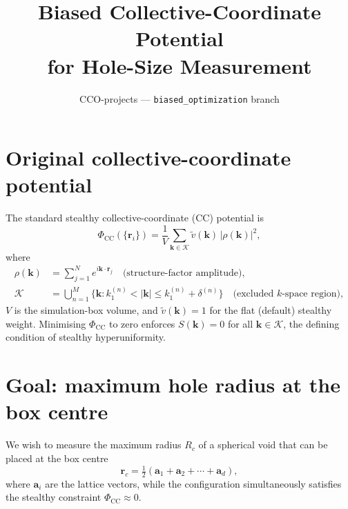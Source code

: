 \documentclass[11pt]{article}
\title{Biased Collective-Coordinate Potential\\for Hole-Size Measurement}
\author{CCO-projects --- \texttt{biased\_optimization} branch}
\date{}
\begin{document}
\maketitle
\tableofcontents
\bigskip

\section{Original collective-coordinate potential}

The standard stealthy collective-coordinate (CC) potential is
\begin{equation}
    \Phi_{\mathrm{CC}}(\{\mathbf{r}_i\})
    = \frac{1}{V}
      \sum_{\mathbf{k}\in\mathcal{K}}
      \tilde{v}(\mathbf{k})\,|\rho(\mathbf{k})|^{2},
    \label{eq:cc}
\end{equation}
where
\begin{align}
    \rho(\mathbf{k}) &= \sum_{j=1}^{N} e^{i\mathbf{k}\cdot\mathbf{r}_j}
    \quad\text{(structure-factor amplitude)},\\[4pt]
    \mathcal{K} &= \bigcup_{n=1}^{M}
        \bigl\{\mathbf{k} : k_1^{(n)} < |\mathbf{k}| \le k_1^{(n)}+\delta^{(n)}\bigr\}
    \quad\text{(excluded $k$-space region)},
\end{align}
$V$ is the simulation-box volume, and $\tilde{v}(\mathbf{k})=1$ for the
flat (default) stealthy weight.
Minimising $\Phi_{\mathrm{CC}}$ to zero enforces $S(\mathbf{k})=0$ for
all $\mathbf{k}\in\mathcal{K}$, the defining condition of stealthy
hyperuniformity.

\section{Goal: maximum hole radius at the box centre}

We wish to measure the maximum radius $R_c$ of a spherical void that can
be placed at the box centre
\begin{equation}
    \mathbf{r}_c = \tfrac{1}{2}(\mathbf{a}_1 + \mathbf{a}_2 + \cdots + \mathbf{a}_d),
\end{equation}
where $\mathbf{a}_i$ are the lattice vectors, while the configuration
simultaneously satisfies the stealthy constraint
$\Phi_{\mathrm{CC}}\approx 0$.

\end{document}

